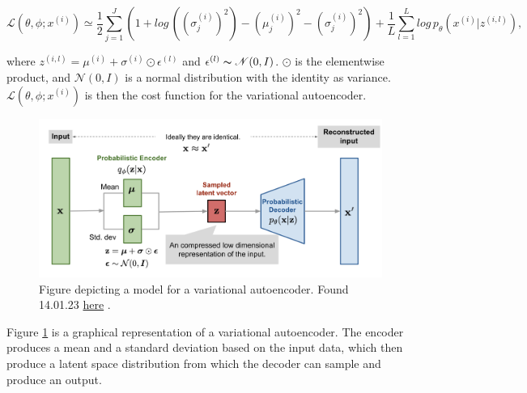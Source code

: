\begin{equation}\label{eq:loss_vae}
    \mathcal{L}(\theta, \phi;x^{(i)}) \simeq \frac{1}{2}\sum_{j=1}^{J}\left(1 + log\, ((\sigma^{(i)}_{j})^2) - (\mu^{(i)}_{j})^2 - (\sigma^{(i)}_{j})^2\right) +\frac{1}{L}\sum_{l=1}^{L}log\, p_{\theta}(x^{(i)}|z^{(i,l)}),
\end{equation}

where $z^{(i,l)} = \mu^{(i)} + \sigma^{(i)} \odot \epsilon^{(l)}$ and $ \epsilon^{(l)} \thicksim \mathcal{N}(0,I)$. $\odot$ is the elementwise product, and $\mathcal{N}(0, I)$ is a 
normal distribution with the identity as variance. $\mathcal{L}(\theta, \phi;x^{(i)})$ is then the cost function for the variational autoencoder. 

\begin{figure}[h!]
    \includegraphics[width=\linewidth]{Figures/Machinelearning/vae-gaussian.png}
    \caption{Figure depicting a model for a variational autoencoder. Found 14.01.23 \href{https://lilianweng.github.io/posts/2018-08-12-vae/vae-gaussian.png}{here} \cite{weng2018VAE}. }
    \label{fig:vae}
\end{figure}

Figure \ref{fig:vae} is a graphical representation of a variational autoencoder. The encoder produces a mean and a standard deviation based on the input data,
which then produce a latent space distribution from which the decoder can sample and produce an output. 

